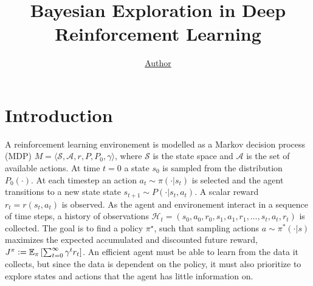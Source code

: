 \documentclass[]{uai2022} %
\title{Bayesian Exploration in Deep Reinforcement Learning}
\author[1]{\href{mailto:<jj@example.edu>?Subject=LALAL}{Author}{}}
\newcommand{\defeq}{\vcentcolon=}
\newcommand{\E}{\mathbb{E}}
\newcommand{\state}{\mathcal{S}}
\newcommand{\action}{\mathcal{A}}
\begin{document}
\maketitle

\begin{abstract}
\end{abstract}


\section{Introduction}
A reinforcement learning environement is modelled as a Markov decision process (MDP)
\(M = \langle \state, \action, r, P, P_0, \gamma \rangle\), where \(\state\) is the
state space and \(\action\) is the set of available actions. At time \(t=0\) a state
\(s_0\) is sampled from the distribution \(P_0(\cdot)\). At each timestep an action
\(a_t \sim \pi(\cdot \vert s_t)\) is selected and the agent transitions to a new state
state \(s_{t+1} \sim P(\cdot \vert s_t, a_t)\). A scalar reward
\(r_t = r(s_t, a_t)\) is observed. As the agent and environement
interact in a sequence of time steps, a history of observations
\(\mathcal{H}_t = (s_0, a_0, r_0, s_1, a_1, r_1, \dots, s_t, a_t, r_t)\) is collected.
The goal is to find a policy \(\pi^\star\), such that sampling actions
\(a \sim \pi^*(\cdot \vert s)\) maximizes the expected accumulated and discounted future reward,
\(J^\pi \defeq \E_\pi \left[ \sum_{t=0}^\infty \gamma^t r_t \right]\). An efficient
agent must be able to learn from the data it collects, but since the data is
dependent on the policy, it must also prioritize to explore states and actions that
the agent has little information on.
\end{document}
